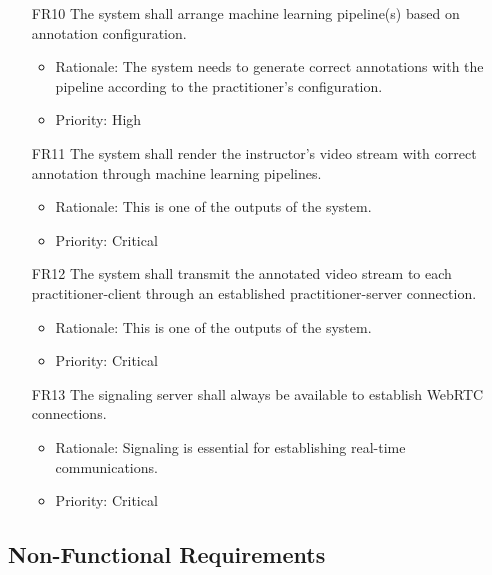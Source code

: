 \documentclass[12pt]{article}
\begin{document}
\begin{itemize}
    \item[FR10] The system shall arrange machine learning pipeline(s) based on annotation configuration. \label{FR10}
    \begin{itemize}
        \item Rationale: The system needs to generate correct annotations with the pipeline according to the practitioner’s configuration.
        \item Priority: High
    \end{itemize}
\end{itemize}
\begin{itemize}
    \item[FR11] The system shall render the instructor’s video stream with correct annotation through machine learning pipelines. \label{FR11}
    \begin{itemize}
        \item Rationale: This is one of the outputs of the system.
        \item Priority: Critical
    \end{itemize}
\end{itemize}
\begin{itemize}
    \item[FR12] The system shall transmit the annotated video stream to each practitioner-client through an established practitioner-server connection. \label{FR12}
    \begin{itemize}
        \item Rationale: This is one of the outputs of the system.
        \item Priority: Critical
    \end{itemize}
\end{itemize}
\begin{itemize}
    \item[FR13] The signaling server shall always be available to establish WebRTC connections. \label{FR13}
    \begin{itemize}
        \item Rationale: Signaling is essential for establishing real-time communications.
        \item Priority: Critical
    \end{itemize}
\end{itemize}
\subsection{Non-Functional Requirements}
\end{document}
